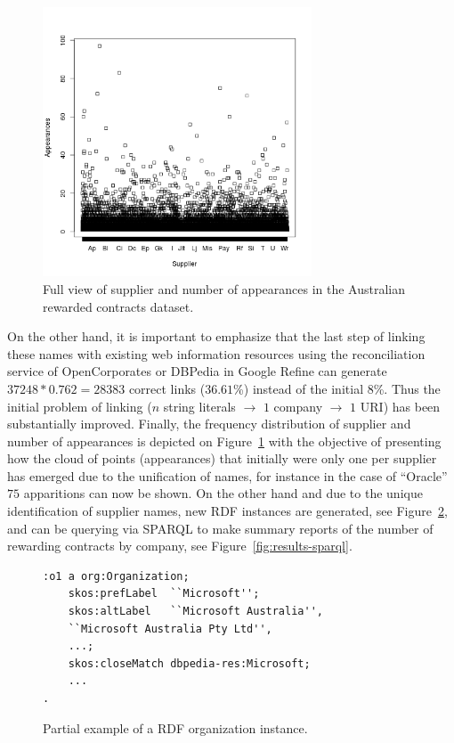 \documentclass[1p,12pt]{elsarticle}
\begin{document}
\begin{figure}[htb]

		\centering
		\includegraphics[width=8cm]{./imgs/corfu-stats}
		\caption{Full view of supplier and number of appearances in the Australian rewarded contracts dataset.}
		\label{fig:results-graph-3}
\end{figure}


On the other hand, it is important to emphasize that the last step of linking these names 
with existing web information resources using the reconciliation service of OpenCorporates or DBPedia in Google Refine can generate 
$37248*0.762=28383$ correct links ($36.61$\%) instead of the initial $8$\%. Thus the initial problem of linking ($n$ string literals $\to$ 
$1$ company $\to$ $1$ URI) has been substantially improved. Finally, the frequency distribution of supplier and number of appearances is depicted on Figure~\ref{fig:results-graph-3} with the objective of presenting how the cloud of points (appearances) that initially were only one per supplier has 
emerged due to the unification of names, for instance in the case of ``Oracle'' $75$ apparitions can now be shown. On the other hand and due 
to the unique identification of supplier names, new RDF instances are generated, see Figure~\ref{fig:results-rdf}, and can be querying via SPARQL to make 
summary reports of the number of rewarding contracts by company, see Figure~\ref{fig:results-sparql}.
\begin{figure}[ht]
\begin{lstlisting}[language=XML]  
:o1 a org:Organization;
	skos:prefLabel 	``Microsoft'';
	skos:altLabel 	``Microsoft Australia'', 
	``Microsoft Australia Pty Ltd'', 
	...;
	skos:closeMatch dbpedia-res:Microsoft;
	...
.
\end{lstlisting}
		\caption{Partial example of a RDF organization instance. }
		\label{fig:results-rdf}
\end{figure}
\end{document}
